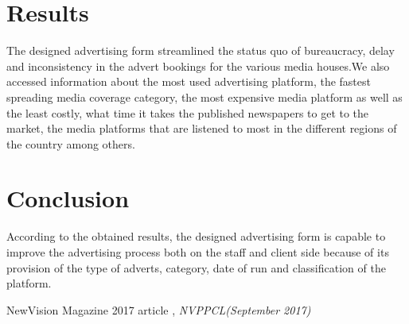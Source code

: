 \documentclass[options]{article}
\begin{document}
\section{\textbf{Results}}
The designed advertising form streamlined  the status quo of bureaucracy, delay and inconsistency in the advert bookings for the various media houses.We also accessed information about the most used advertising platform, the fastest spreading media coverage category, the most expensive media platform as well as the least costly, what time it takes the published newspapers to get to the market, the media platforms that are listened to most in the different regions of the country among others.

\section{\textbf{Conclusion}}
According to the obtained results, the designed advertising form is capable to improve the advertising process both on the staff and client side because of its provision of the type of adverts, category, date of run and classification of the platform. 
\begin{thebibliography}{10} NewVision Magazine 2017 article , \emph{NVPPCL(September 2017)} \end{thebibliography}
\end{document}
